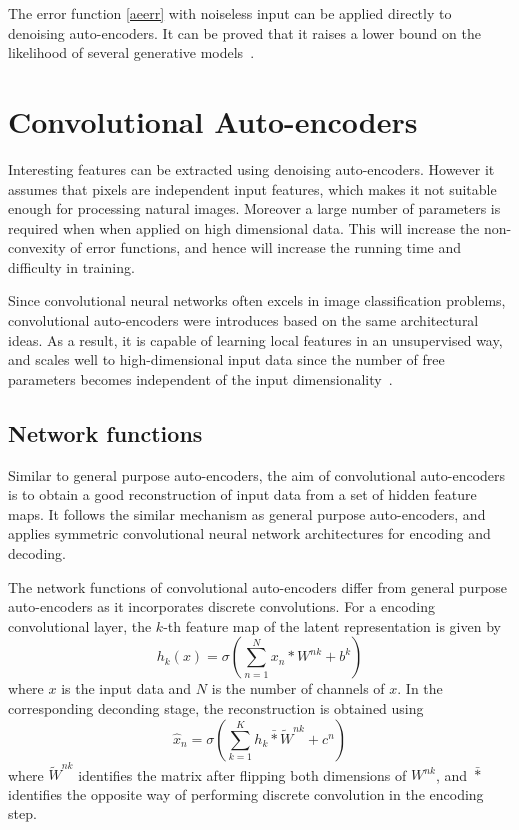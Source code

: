 The error function \ref{aeerr} with noiseless input can be applied directly to denoising auto-encoders. It can be proved that it raises a lower bound on the likelihood of several generative models~\cite{vincent2008extracting}.

\section{Convolutional Auto-encoders}
\label{sec:Convolutional Auto-encoders}
Interesting features can be extracted using denoising auto-encoders. However it assumes that pixels are independent input features, which makes it not suitable enough for processing natural images. Moreover a large number of parameters is required when when applied on high dimensional data. This will increase the non-convexity of error functions, and hence will increase the running time and difficulty in training.

Since convolutional neural networks often excels in image classification problems, convolutional auto-encoders were introduces based on the same architectural ideas. As a result, it is capable of learning local features in an unsupervised way, and scales well to high-dimensional input data since the number of free parameters becomes independent of the input dimensionality~\cite{masci2011stacked}.

\subsection{Network functions}
\label{Network functions}
Similar to general purpose auto-encoders, the aim of convolutional auto-encoders is to obtain a good reconstruction of input data from a set of hidden feature maps. It follows the similar mechanism as general purpose auto-encoders, and applies symmetric convolutional neural network architectures for encoding and decoding.

The network functions of convolutional auto-encoders differ from general purpose auto-encoders as it incorporates discrete convolutions. For a encoding convolutional layer, the $k$-th feature map of the latent representation is given by
\begin{equation}
	h_k(x) = \sigma(\sum\limits_{n=1}^Nx_n\ast W^{nk} + b^k)
\end{equation}
where $x$ is the input data and $N$ is the number of channels of $x$. In the corresponding deconding stage, the reconstruction is obtained using
\begin{equation}
	\hat{x}_n = \sigma(\sum\limits_{k=1}^Kh_k\bar{\ast} \tilde{W}^{nk} + c^n)
\end{equation}
where $\tilde{W}^{nk}$ identifies the matrix after flipping both dimensions of $W^{nk}$, and $\bar{\ast}$ identifies the opposite way of performing discrete convolution in the encoding step.

